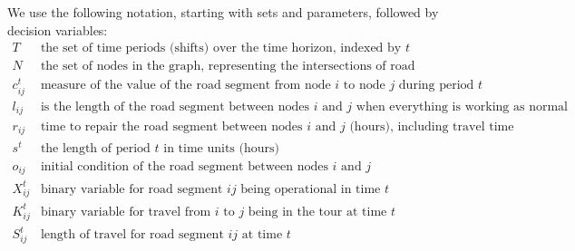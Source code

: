 \documentclass[10pt]{article}
\begin{document}
We use the following notation, starting with sets and parameters, followed by decision variables:
\begin{displaymath}
\begin{array}{ll}
T & \mbox{the set of time periods (shifts) over the time horizon, indexed by $t$}\\
N & \mbox{the set of nodes in the graph, representing the intersections of road segments}\\
c_{ij}^t & \mbox{measure of the value of the road segment from node $i$ to node $j$ during period $t$}\\
l_{ij} & \mbox{is the length of the road segment between nodes $i$ and $j$ when everything is working as normal}\\
r_{ij} & \mbox{time to repair the road segment between nodes $i$ and $j$ (hours), including travel time}\\
s^t & \mbox{the length of period $t$ in time units (hours)}\\
o_{ij} & \mbox{initial condition of the road segment between nodes $i$ and $j$}\\
X_{ij}^t & \mbox{binary variable for road segment $ij$ being operational in time $t$}\\
K_{ij}^t & \mbox{binary variable for travel from $i$ to $j$ being in the tour at time $t$}\\
S_{ij}^t & \mbox{length of travel for road segment $ij$ at time $t$}\\
\end{array}
\end{displaymath}
\end{document}

